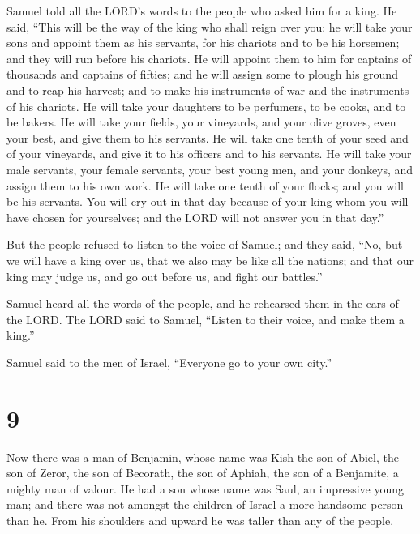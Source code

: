  Samuel told all the LORD's words to the people who asked
him for a king.  He said, ``This will be the way of the
king who shall reign over you: he will take your sons and appoint them
as his servants, for his chariots and to be his horsemen; and they will
run before his chariots.  He will appoint them to him for
captains of thousands and captains of fifties; and he will assign some
to plough his ground and to reap his harvest; and to make his
instruments of war and the instruments of his chariots.  He
will take your daughters to be perfumers, to be cooks, and to be bakers.
 He will take your fields, your vineyards, and your olive
groves, even your best, and give them to his servants.  He
will take one tenth of your seed and of your vineyards, and give it to
his officers and to his servants.  He will take your male
servants, your female servants, your best young men, and your donkeys,
and assign them to his own work.  He will take one tenth of
your flocks; and you will be his servants.  You will cry
out in that day because of your king whom you will have chosen for
yourselves; and the LORD will not answer you in that day.''

 But the people refused to listen to the voice of Samuel;
and they said, ``No, but we will have a king over us,  that
we also may be like all the nations; and that our king may judge us, and
go out before us, and fight our battles.''

 Samuel heard all the words of the people, and he rehearsed
them in the ears of the LORD.  The LORD said to Samuel,
``Listen to their voice, and make them a king.''

Samuel said to the men of Israel, ``Everyone go to your own city.''

\hypertarget{section-8}{%
\section{9}\label{section-8}}

 Now there was a man of Benjamin, whose name was Kish the
son of Abiel, the son of Zeror, the son of Becorath, the son of Aphiah,
the son of a Benjamite, a mighty man of valour.  He had a
son whose name was Saul, an impressive young man; and there was not
amongst the children of Israel a more handsome person than he. From his
shoulders and upward he was taller than any of the people.

